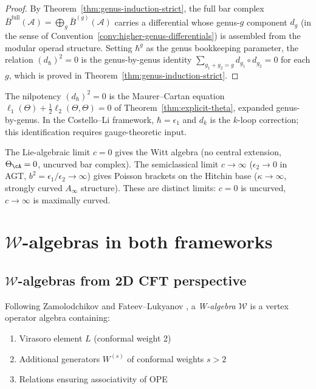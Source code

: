 \begin{proof}
By Theorem~\ref{thm:genus-induction-strict}, the full bar complex
$\bar{B}^{\mathrm{full}}(\mathcal{A}) = \bigoplus_g \bar{B}^{(g)}(\mathcal{A})$
carries a differential whose genus-$g$ component $d_g$ (in the sense of Convention~\ref{conv:higher-genus-differentials}) is assembled from
the modular operad structure.  Setting $\hbar^g$ as the genus bookkeeping
parameter, the relation $(d_\hbar)^2 = 0$ is the genus-by-genus
identity $\sum_{g_1 + g_2 = g} d_{g_1} \circ d_{g_2} = 0$
for each $g$, which is proved in Theorem~\ref{thm:genus-induction-strict}.
\end{proof}

\begin{remark}
The nilpotency $(d_\hbar)^2 = 0$ is the Maurer--Cartan equation $\ell_1(\Theta) + \tfrac{1}{2}\ell_2(\Theta, \Theta) = 0$ of Theorem~\ref{thm:explicit-theta}, expanded genus-by-genus.  In the Costello--Li framework, $\hbar = \epsilon_1$ and $d_k$ is the $k$-loop correction; this identification requires gauge-theoretic input.
\end{remark}

\begin{example}
The Lie-algebraic limit $c = 0$ gives the Witt algebra (no central extension, $\Theta_\cA = 0$, uncurved bar complex).  The semiclassical limit $c \to \infty$ ($\epsilon_2 \to 0$ in AGT, $b^2 = \epsilon_1/\epsilon_2 \to \infty$) gives Poisson brackets on the Hitchin base ($\kappa \to \infty$, strongly curved $A_\infty$ structure).  These are distinct limits: $c = 0$ is uncurved, $c \to \infty$ is maximally curved.
\end{example}


\section{$\mathcal{W}$-algebras in both frameworks}
\label{sec:w-algebras-unifying}

\subsection{$\mathcal{W}$-algebras from 2D CFT perspective}

\begin{definition}\label{def:w-algebra-cft}
Following Zamolodchikov \cite{Zamolodchikov} and Fateev--Lukyanov \cite{FL88}, a 
\emph{W-algebra} $\mathcal{W}$ is a vertex operator algebra containing:
\begin{enumerate}
\item Virasoro element $L$ (conformal weight 2)
\item Additional generators $W^{(s)}$ of conformal weights $s > 2$
\item Relations ensuring associativity of OPE
\end{enumerate}
\end{definition}

